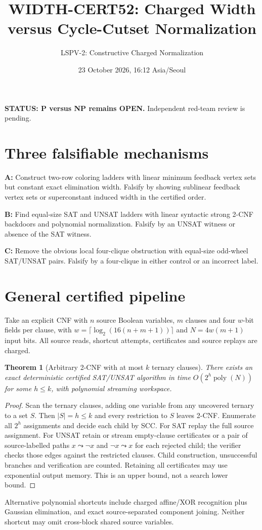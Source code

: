 \documentclass[11pt]{article}
\title{WIDTH-CERT52: Charged Width versus Cycle-Cutset Normalization}
\author{LSPV-2: Constructive Charged Normalization}
\date{23 October 2026, 16:12 Asia/Seoul}
\newtheorem{theorem}{Theorem}
\begin{document}
\maketitle
\textbf{STATUS: P versus NP remains OPEN.} Independent red-team review is pending.

\section{Three falsifiable mechanisms}
\noindent\textbf{A:} Construct two-row coloring ladders with linear minimum feedback vertex sets but constant exact elimination width. Falsify by showing sublinear feedback vertex sets or superconstant induced width in the certified order.\par
\noindent\textbf{B:} Find equal-size SAT and UNSAT ladders with linear syntactic strong 2-CNF backdoors and polynomial normalization. Falsify by an UNSAT witness or absence of the SAT witness.\par
\noindent\textbf{C:} Remove the obvious local four-clique obstruction with equal-size odd-wheel SAT/UNSAT pairs. Falsify by a four-clique in either control or an incorrect label.\par

\section{General certified pipeline}
Take an explicit CNF with \(n\) source Boolean variables, \(m\) clauses and four \(w\)-bit fields per clause, with \(w=\lceil\log_2(16(n+m+1))\rceil\) and \(N=4w(m+1)\) input bits. All source reads, shortcut attempts, certificates and source replays are charged.
\begin{theorem}[Arbitrary 2-CNF with at most \(k\) ternary clauses]
There exists an exact deterministic certified SAT/UNSAT algorithm in time \(O(2^h\operatorname{poly}(N))\) for some \(h\le k\), with polynomial streaming workspace.
\end{theorem}
\begin{proof}
Scan the ternary clauses, adding one variable from any uncovered ternary to a set \(S\). Then \(|S|=h\le k\) and every restriction to \(S\) leaves 2-CNF. Enumerate all \(2^h\) assignments and decide each child by SCC. For SAT replay the full source assignment. For UNSAT retain or stream empty-clause certificates or a pair of source-labelled paths \(x\leadsto\neg x\) and \(\neg x\leadsto x\) for each rejected child; the verifier checks those edges against the restricted clauses. Child construction, unsuccessful branches and verification are counted. Retaining all certificates may use exponential output memory. This is an upper bound, not a search lower bound.
\end{proof}
Alternative polynomial shortcuts include charged affine/XOR recognition plus Gaussian elimination, and exact source-separated component joining. Neither shortcut may omit cross-block shared source variables.
\end{document}
